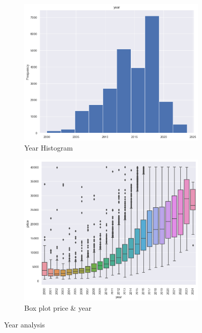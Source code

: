 \begin{itemize}
    \begin{figure}[ht]
        \begin{subfigure}[b]{0.48\linewidth}
            \centering
            \includegraphics[width=\linewidth]{images/priceprediction/after_outliers/year.png}
            \caption{Year Histogram}
            \label{fig:year-hist}
        \end{subfigure}
        \hfill
        \begin{subfigure}[b]{0.48\linewidth}
            \centering
            \includegraphics[width=\linewidth]{images/priceprediction/boxplots/year_price.png}
            \caption{Box plot price \& year}
            \label{fig:year-box}
        \end{subfigure}
        \caption{Year analysis}
        \label{fig:year}
    \end{figure}


\end{itemize}
